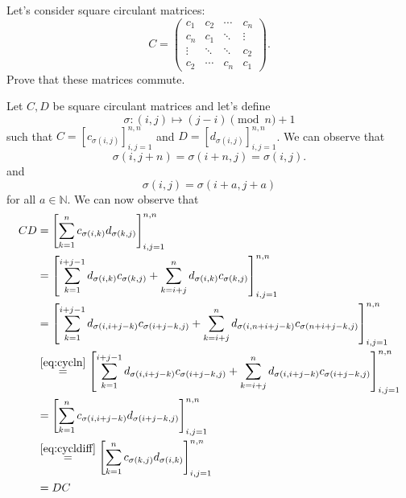 Let's consider square circulant matrices:
\[
  C =
  \begin{pmatrix}
    c_1 & c_2 & \cdots & c_n\\
    c_n & c_1 & \ddots & \vdots\\
    \vdots & \ddots & \ddots & c_2\\
    c_2 & \cdots & c_n & c_1
  \end{pmatrix}.
\]
Prove that these matrices commute.

\begin{solution}
  Let $C,D$ be square circulant matrices and let's define
  \[ \sigma : (i,j) \mapsto (j - i) \pmod{n}+1 \]
  such that
  $C = [c_{\sigma(i,j)}]_{i,j=1}^{n,n}$ and
  $D = [d_{\sigma(i,j)}]_{i,j=1}^{n,n}$.
  We can observe that
  \begin{equation}
    \label{eq:cycln}
    \sigma(i,j+n) = \sigma(i+n,j) = \sigma(i,j).
  \end{equation}
  and
  \begin{equation}
    \label{eq:cycldiff}
    \sigma(i,j) = \sigma(i+a,j+a)
  \end{equation}
  for all $a \in \mathbb{N}$.
  We can now observe that
  \begin{align*}
    CD
    & =
    \left[
      \sum_{k=1}^n
      c_{\sigma(i,k)}d_{\sigma(k,j)}
    \right]_{i,j=1}^{n,n}\\
    & =
    \left[
      \sum_{k=1}^{i+j-1}
      d_{\sigma(i,k)}c_{\sigma(k,j)}
      +
      \sum_{k=i+j}^{n}
      d_{\sigma(i,k)}c_{\sigma(k,j)}
    \right]_{i,j=1}^{n,n}\\
    & =
    \left[
      \sum_{k=1}^{i+j-1}
      d_{\sigma(i,i+j-k)}c_{\sigma(i+j-k,j)}
      +
      \sum_{k=i+j}^{n}
      d_{\sigma(i,n+i+j-k)}c_{\sigma(n+i+j-k,j)}
    \right]_{i,j=1}^{n,n}\\
    & \stackrel{\eqref{eq:cycln}}{=}
    \left[
      \sum_{k=1}^{i+j-1}
      d_{\sigma(i,i+j-k)}c_{\sigma(i+j-k,j)}
      +
      \sum_{k=i+j}^{n}
      d_{\sigma(i,i+j-k)}c_{\sigma(i+j-k,j)}
    \right]_{i,j=1}^{n,n}\\
    & =
    \left[
      \sum_{k=1}^n
      c_{\sigma(i,i+j-k)}d_{\sigma(i+j-k,j)}
    \right]_{i,j=1}^{n,n}\\
    & \stackrel{\eqref{eq:cycldiff}}{=}
    \left[
      \sum_{k=1}^n
      c_{\sigma(k,j)}d_{\sigma(i,k)}
    \right]_{i,j=1}^{n,n}\\
    & = DC
  \end{align*}
\end{solution}

